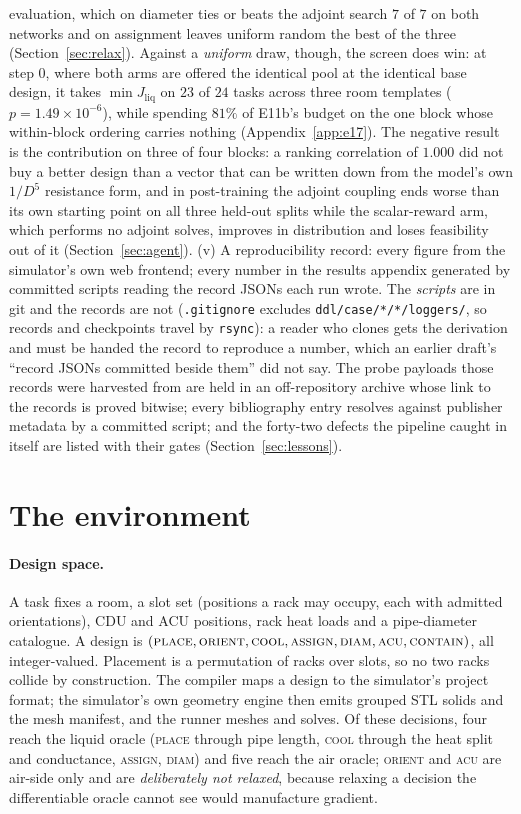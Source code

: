 \documentclass{article}
\newcommand{\Jliq}{J_{\mathrm{liq}}}
\begin{document}
evaluation, which on diameter ties or beats the adjoint search $7$ of $7$ on both networks
and on assignment leaves uniform random the best of the three
(Section~\ref{sec:relax}).  Against a \emph{uniform} draw, though, the screen does win: at step
0, where both arms are offered the identical pool at the identical base design, it takes
$\min\Jliq$ on $23$ of $24$ tasks across three room templates ($p = 1.49\times10^{-6}$),
while spending $81\%$ of E11b's budget on the one block whose within-block ordering carries
nothing (Appendix~\ref{app:e17}).  The negative result is the contribution on three of four
blocks: a ranking correlation of $1.000$ did not buy a better design than a vector that can be
written down from the model's own $1/D^5$ resistance form, and in post-training the adjoint
coupling ends worse than its own starting point on all three held-out splits while the
scalar-reward arm, which performs no adjoint solves, improves in distribution and loses
feasibility out of it (Section~\ref{sec:agent}).
(v) A reproducibility record: every figure from the simulator's own web frontend; every
number in the results appendix generated by committed scripts reading the record JSONs
each run wrote.  The \emph{scripts} are in git and the records are not
(\texttt{.gitignore} excludes \texttt{ddl/case/*/*/loggers/}, so records and checkpoints
travel by \texttt{rsync}): a reader who clones gets the derivation and must be handed the
record to reproduce a number, which an earlier draft's ``record JSONs committed beside
them'' did not say.  The probe payloads those records were harvested
from are held in an off-repository archive whose link to the records is proved bitwise; every
bibliography entry resolves against publisher metadata by a committed script; and the forty-two defects the pipeline caught in itself are listed
with their gates (Section~\ref{sec:lessons}).

\section{The environment}
\label{sec:env}

\paragraph{Design space.}
A task fixes a room, a slot set (positions a rack may occupy, each with admitted
orientations), CDU and ACU positions, rack heat loads and a pipe-diameter
catalogue.  A design is
$(\textsc{place}, \textsc{orient}, \textsc{cool}, \textsc{assign},
  \textsc{diam}, \textsc{acu}, \textsc{contain})$, all integer-valued.
Placement is a permutation of racks over slots, so no two racks collide by
construction.  The compiler maps a design to the simulator's project format; the
simulator's own geometry engine then emits grouped STL solids and the mesh
manifest, and the runner meshes and solves.  Of these decisions, four reach the
liquid oracle (\textsc{place} through pipe length, \textsc{cool} through the
heat split and conductance, \textsc{assign}, \textsc{diam}) and five reach the
air oracle; \textsc{orient} and \textsc{acu} are air-side only and are
\emph{deliberately not relaxed}, because relaxing a decision the differentiable
oracle cannot see would manufacture gradient.
\end{document}
